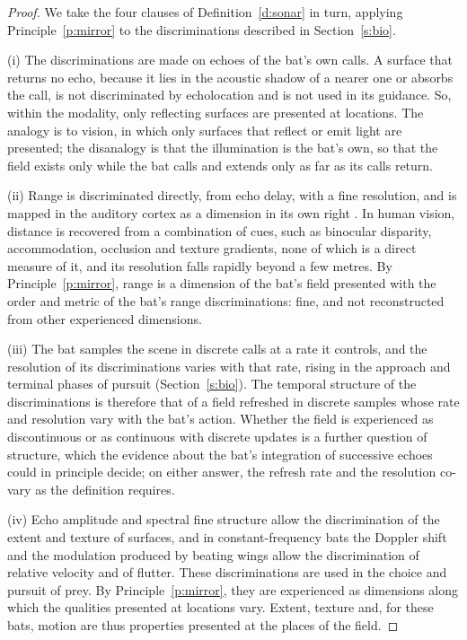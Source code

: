 \documentclass{situationist-preprint}
\begin{document}
\begin{proof}
We take the four clauses of Definition~\ref{d:sonar} in turn, applying Principle~\ref{p:mirror} to the discriminations described in Section~\ref{s:bio}.

(i) The discriminations are made on echoes of the bat's own calls. A surface that returns no echo, because it lies in the acoustic shadow of a nearer one or absorbs the call, is not discriminated by echolocation and is not used in its guidance. So, within the modality, only reflecting surfaces are presented at locations. The analogy is to vision, in which only surfaces that reflect or emit light are presented; the disanalogy is that the illumination is the bat's own, so that the field exists only while the bat calls and extends only as far as its calls return.

(ii) Range is discriminated directly, from echo delay, with a fine resolution, and is mapped in the auditory cortex as a dimension in its own right \citep{Suga1990}. In human vision, distance is recovered from a combination of cues, such as binocular disparity, accommodation, occlusion and texture gradients, none of which is a direct measure of it, and its resolution falls rapidly beyond a few metres. By Principle~\ref{p:mirror}, range is a dimension of the bat's field presented with the order and metric of the bat's range discriminations: fine, and not reconstructed from other experienced dimensions.

(iii) The bat samples the scene in discrete calls at a rate it controls, and the resolution of its discriminations varies with that rate, rising in the approach and terminal phases of pursuit (Section~\ref{s:bio}). The temporal structure of the discriminations is therefore that of a field refreshed in discrete samples whose rate and resolution vary with the bat's action. Whether the field is experienced as discontinuous or as continuous with discrete updates is a further question of structure, which the evidence about the bat's integration of successive echoes could in principle decide; on either answer, the refresh rate and the resolution co-vary as the definition requires.

(iv) Echo amplitude and spectral fine structure allow the discrimination of the extent and texture of surfaces, and in constant-frequency bats the Doppler shift and the modulation produced by beating wings allow the discrimination of relative velocity and of flutter. These discriminations are used in the choice and pursuit of prey. By Principle~\ref{p:mirror}, they are experienced as dimensions along which the qualities presented at locations vary. Extent, texture and, for these bats, motion are thus properties presented at the places of the field.
\end{proof}
\end{document}
